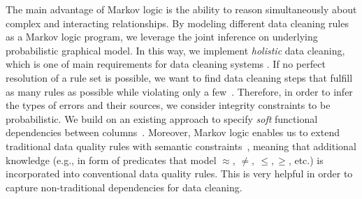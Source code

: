 The main advantage of Markov logic is the ability to reason simultaneously about complex and interacting relationships. By modeling different data cleaning rules as a Markov logic program, we leverage the joint inference on underlying probabilistic graphical model. In this way, we implement \textit{holistic} data cleaning, which is one of main requirements for data cleaning systems \cite{fan2013data, Fan:2014:IRM:2628135.2567657, Dallachiesa:2013:NCD:2463676.2465327}. If no perfect resolution of a rule set is possible, we want to find data cleaning steps that fulfill as many rules as possible while violating only a few~\cite{genesereth1987logical, domingos2009markov}. Therefore, in order to infer the types of errors and their sources, we consider integrity constraints to be probabilistic. We build on an existing approach to specify \textit{soft} functional dependencies between columns~\cite{Ilyas:2004:CAD:1007568.1007641}. 
Moreover, Markov logic enables us to extend traditional data quality rules with semantic constraints~\cite{spies2013knowledge}, meaning that additional knowledge (e.g., in form of predicates that model $\approx$, $\neq,~\leq,\geq$, etc.) is incorporated into conventional data quality rules. This is very helpful in order to capture non-traditional dependencies \cite{chen2009analyses} for data cleaning. %


